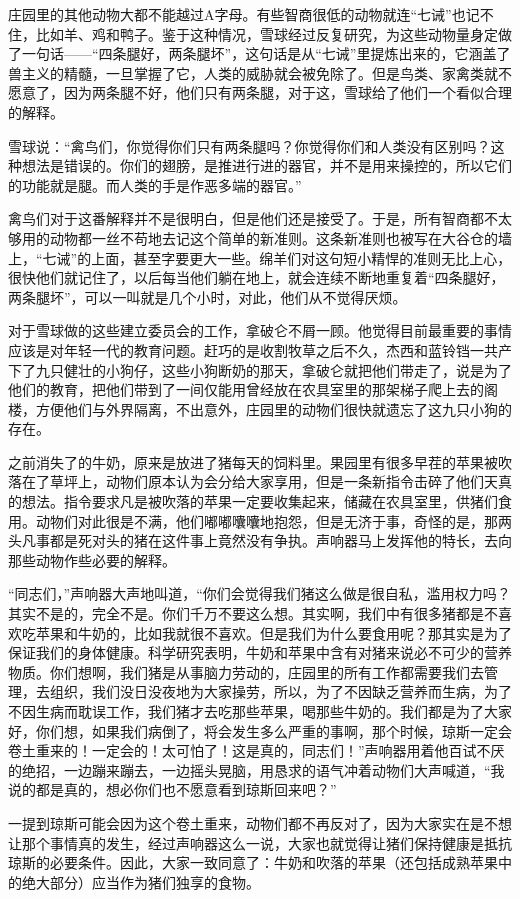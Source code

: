 庄园里的其他动物大都不能越过A字母。有些智商很低的动物就连“七诫”也记不住，比如羊、鸡和鸭子。鉴于这种情况，雪球经过反复研究，为这些动物量身定做了一句话——“四条腿好，两条腿坏”，这句话是从“七诫”里提炼出来的，它涵盖了兽主义的精髓，一旦掌握了它，人类的威胁就会被免除了。但是鸟类、家禽类就不愿意了，因为两条腿不好，他们只有两条腿，对于这，雪球给了他们一个看似合理的解释。

雪球说：“禽鸟们，你觉得你们只有两条腿吗？你觉得你们和人类没有区别吗？这种想法是错误的。你们的翅膀，是推进行进的器官，并不是用来操控的，所以它们的功能就是腿。而人类的手是作恶多端的器官。”

禽鸟们对于这番解释并不是很明白，但是他们还是接受了。于是，所有智商都不太够用的动物都一丝不苟地去记这个简单的新准则。这条新准则也被写在大谷仓的墙上，“七诫”的上面，甚至字要更大一些。绵羊们对这句短小精悍的准则无比上心，很快他们就记住了，以后每当他们躺在地上，就会连续不断地重复着“四条腿好，两条腿坏”，可以一叫就是几个小时，对此，他们从不觉得厌烦。

对于雪球做的这些建立委员会的工作，拿破仑不屑一顾。他觉得目前最重要的事情应该是对年轻一代的教育问题。赶巧的是收割牧草之后不久，杰西和蓝铃铛一共产下了九只健壮的小狗仔，这些小狗断奶的那天，拿破仑就把他们带走了，说是为了他们的教育，把他们带到了一间仅能用曾经放在农具室里的那架梯子爬上去的阁楼，方便他们与外界隔离，不出意外，庄园里的动物们很快就遗忘了这九只小狗的存在。

之前消失了的牛奶，原来是放进了猪每天的饲料里。果园里有很多早茬的苹果被吹落在了草坪上，动物们原本认为会分给大家享用，但是一条新指令击碎了他们天真的想法。指令要求凡是被吹落的苹果一定要收集起来，储藏在农具室里，供猪们食用。动物们对此很是不满，他们嘟嘟囔囔地抱怨，但是无济于事，奇怪的是，那两头凡事都是死对头的猪在这件事上竟然没有争执。声响器马上发挥他的特长，去向那些动物作些必要的解释。

“同志们，”声响器大声地叫道，“你们会觉得我们猪这么做是很自私，滥用权力吗？其实不是的，完全不是。你们千万不要这么想。其实啊，我们中有很多猪都是不喜欢吃苹果和牛奶的，比如我就很不喜欢。但是我们为什么要食用呢？那其实是为了保证我们的身体健康。科学研究表明，牛奶和苹果中含有对猪来说必不可少的营养物质。你们想啊，我们猪是从事脑力劳动的，庄园里的所有工作都需要我们去管理，去组织，我们没日没夜地为大家操劳，所以，为了不因缺乏营养而生病，为了不因生病而耽误工作，我们猪才去吃那些苹果，喝那些牛奶的。我们都是为了大家好，你们想，如果我们病倒了，将会发生多么严重的事啊，那个时候，琼斯一定会卷土重来的！一定会的！太可怕了！这是真的，同志们！”声响器用着他百试不厌的绝招，一边蹦来蹦去，一边摇头晃脑，用恳求的语气冲着动物们大声喊道，“我说的都是真的，想必你们也不愿意看到琼斯回来吧？”

一提到琼斯可能会因为这个卷土重来，动物们都不再反对了，因为大家实在是不想让那个事情真的发生，经过声响器这么一说，大家也就觉得让猪们保持健康是抵抗琼斯的必要条件。因此，大家一致同意了：牛奶和吹落的苹果（还包括成熟苹果中的绝大部分）应当作为猪们独享的食物。
